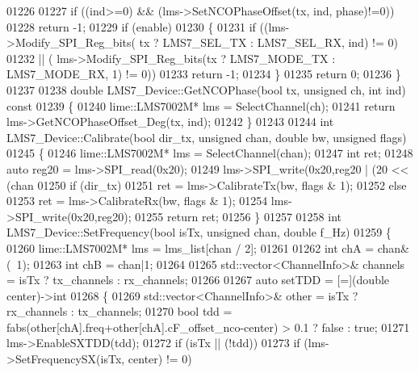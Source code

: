 \begin{DoxyCode}
{{{01226 
01227     \textcolor{keywordflow}{if} ((ind>=0) && (lms->SetNCOPhaseOffset(tx, ind, phase)!=0))
01228         \textcolor{keywordflow}{return} -1;
01229     \textcolor{keywordflow}{if} (enable)
01230     \{
01231         \textcolor{keywordflow}{if} ((lms->Modify_SPI_Reg_bits( tx ? LMS7_SEL_TX : LMS7_SEL_RX, ind) != 0)
01232         || ( lms->Modify_SPI_Reg_bits(tx ? LMS7_MODE_TX : LMS7_MODE_RX, 1) != 0))
01233             \textcolor{keywordflow}{return} -1;
01234     \}
01235     \textcolor{keywordflow}{return} 0;
01236 \}
01237 
01238 \textcolor{keywordtype}{double} LMS7_Device::GetNCOPhase(\textcolor{keywordtype}{bool} tx, \textcolor{keywordtype}{unsigned} ch, \textcolor{keywordtype}{int} ind)\textcolor{keyword}{ const}
01239 \textcolor{keyword}{}\{
01240     lime::LMS7002M* lms = SelectChannel(ch);
01241     \textcolor{keywordflow}{return} lms->GetNCOPhaseOffset_Deg(tx, ind);
01242 \}
01243 
01244 \textcolor{keywordtype}{int} LMS7_Device::Calibrate(\textcolor{keywordtype}{bool} dir_tx, \textcolor{keywordtype}{unsigned} chan, \textcolor{keywordtype}{double} bw, \textcolor{keywordtype}{unsigned} flags)
01245 \{
01246     lime::LMS7002M* lms = SelectChannel(chan);
01247     \textcolor{keywordtype}{int} ret;
01248     \textcolor{keyword}{auto} reg20 = lms->SPI_read(0x20);
01249     lms->SPI_write(0x20,reg20 | (20 << (chan%
01250     \textcolor{keywordflow}{if} (dir\_tx)
01251         ret = lms->CalibrateTx(bw, flags & 1);
01252     \textcolor{keywordflow}{else}
01253         ret = lms->CalibrateRx(bw, flags & 1);
01254     lms->SPI_write(0x20,reg20);
01255     \textcolor{keywordflow}{return} ret;
01256 \}
01257 
01258 \textcolor{keywordtype}{int} LMS7_Device::SetFrequency(\textcolor{keywordtype}{bool} isTx, \textcolor{keywordtype}{unsigned} chan, \textcolor{keywordtype}{double} f\_Hz)
01259 \{
01260     lime::LMS7002M* lms = lms_list[chan / 2];
01261 
01262     \textcolor{keywordtype}{int} chA = chan&(~1);
01263     \textcolor{keywordtype}{int} chB = chan|1;
01264 
01265     std::vector<ChannelInfo>& channels = isTx ? tx_channels : rx_channels;
01266 
01267     \textcolor{keyword}{auto} setTDD = [=](\textcolor{keywordtype}{double} center)->\textcolor{keywordtype}{int}
01268     \{
01269         std::vector<ChannelInfo>& other = isTx ? rx_channels : tx_channels;
01270         \textcolor{keywordtype}{bool} tdd =  fabs(other[chA].freq+other[chA].cF\_offset\_nco-center) > 0.1 ? \textcolor{keyword}{false} : \textcolor{keyword}{true};
01271         lms->EnableSXTDD(tdd);
01272         \textcolor{keywordflow}{if} (isTx || (!tdd))
01273             \textcolor{keywordflow}{if} (lms->SetFrequencySX(isTx, center) != 0)
}}}
\end{DoxyCode}
